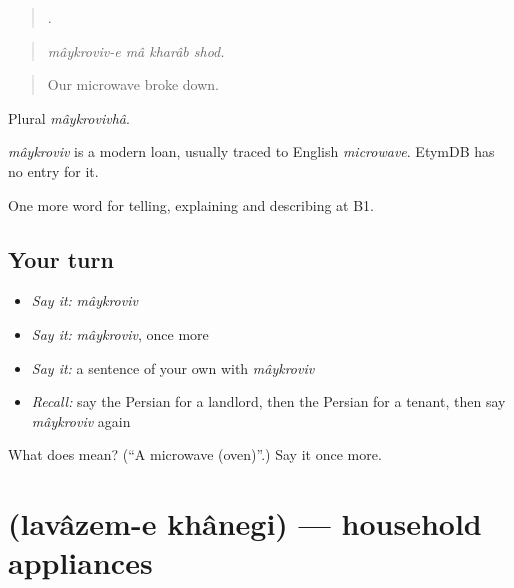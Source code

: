 \begin{quote}
   .
\end{quote}

\begin{quote}
\emph{mâykroviv-e mâ kharâb shod.}
\end{quote}

\begin{quote}
Our microwave broke down.
\end{quote}

Plural \emph{mâykrovivhâ}.

\begin{cousinweb}
\emph{mâykroviv} is a modern loan, usually traced to English \emph{microwave}. EtymDB has no entry for it.
\end{cousinweb}

\begin{grammarlens}[title={What you've built}]
One more word for telling, explaining and describing at B1.
\end{grammarlens}

\subsection*{Your turn}
\begin{itemize}
\raggedright
  \item \emph{Say it:} \emph{mâykroviv}
  \item \emph{Say it:} \emph{mâykroviv}, once more
  \item \emph{Say it:} a sentence of your own with \emph{mâykroviv}
  \item \emph{Recall:} say the Persian for a landlord, then the Persian for a tenant, then say \emph{mâykroviv} again
\end{itemize}

\begin{tcolorbox}[breakable,colback=teal!4,colframe=teal!35!black,title={Before you move on}]
What does  mean? (\textquotedblleft{}A microwave (oven)\textquotedblright{}.) Say it once more.
\end{tcolorbox}
\section[\texorpdfstring{\fa{لوازم} \fa{خانگی} (lavâzem-e khânegi)}{لوازم خانگی (lavâzem-e khânegi)}]{  (lavâzem-e khânegi) — household appliances}

\label{lesson:FA-C538-lavazem-e-khanegi}



